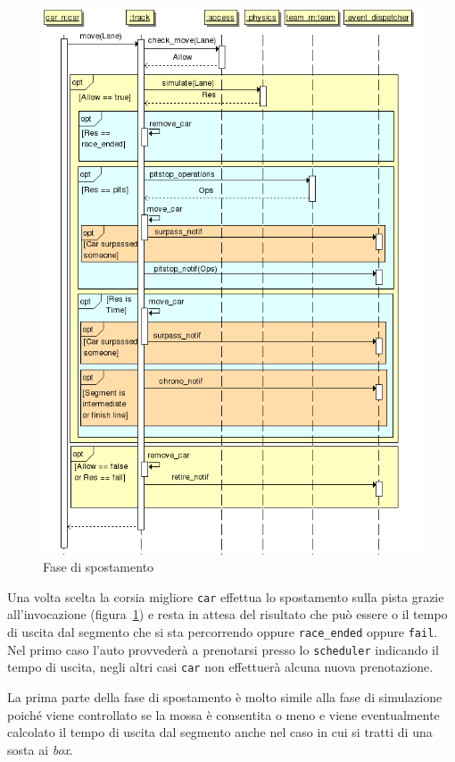 \begin{figure}
\includegraphics[width=\textwidth]{diagrammi/Move}
\caption{Fase di spostamento}
\label{fig:move}
\end{figure}

Una volta scelta la corsia migliore \texttt{car} effettua lo spostamento sulla pista grazie all'invocazione  (figura~\ref{fig:move}) e resta in attesa del risultato che può essere o il tempo di uscita dal segmento che si sta percorrendo oppure \texttt{race\_ended} oppure \texttt{fail}. Nel primo caso l'auto provvederà a prenotarsi presso lo \texttt{scheduler} indicando il tempo di uscita, negli altri casi \texttt{car} non effettuerà alcuna nuova prenotazione.

La prima parte della fase di spostamento è molto simile alla fase di simulazione poiché viene controllato se la mossa è consentita o meno e viene eventualmente calcolato il tempo di uscita dal segmento anche nel caso in cui si tratti di una sosta ai \textit{box}.


